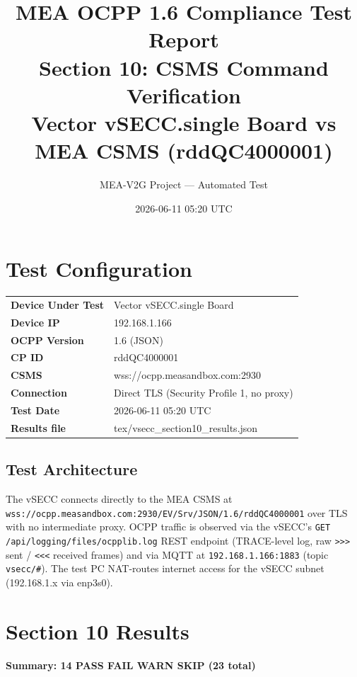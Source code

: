 \documentclass[10pt, a4paper]{article}
\title{\textbf{MEA OCPP 1.6 Compliance Test Report}\\[0.3em]
\large Section 10: CSMS Command Verification\\[0.3em]
\normalsize Vector vSECC.single Board vs MEA CSMS (rddQC4000001)}
\author{MEA-V2G Project --- Automated Test}
\date{2026-06-11 05:20 UTC}
\begin{document}
\maketitle
\tableofcontents
\newpage

\section{Test Configuration}
\begin{tabular}{ll}
\textbf{Device Under Test} & Vector vSECC.single Board \\
\textbf{Device IP}         & 192.168.1.166 \\
\textbf{OCPP Version}      & 1.6 (JSON) \\
\textbf{CP ID}             & rddQC4000001 \\
\textbf{CSMS}              & wss://ocpp.measandbox.com:2930 \\
\textbf{Connection}        & Direct TLS (Security Profile 1, no proxy) \\
\textbf{Test Date}         & 2026-06-11 05:20 UTC \\
\textbf{Results file}      & tex/vsecc\_section10\_results.json \\
\end{tabular}

\subsection*{Test Architecture}
The vSECC connects directly to the MEA CSMS at
\texttt{wss://ocpp.measandbox.com:2930/EV/Srv/JSON/1.6/rddQC4000001}
over TLS with no intermediate proxy.
OCPP traffic is observed via the vSECC's \texttt{GET /api/logging/files/ocpplib.log}
REST endpoint (TRACE-level log, raw \texttt{>>>} sent / \texttt{<<<} received frames)
and via MQTT at \texttt{192.168.1.166:1883} (topic \texttt{vsecc/\#}).
The test PC NAT-routes internet access for the vSECC subnet (192.168.1.x via enp3s0).

\section{Section 10 Results}
\textbf{Summary: 14 PASS  FAIL  WARN  SKIP \quad (23 total)}
\end{document}
